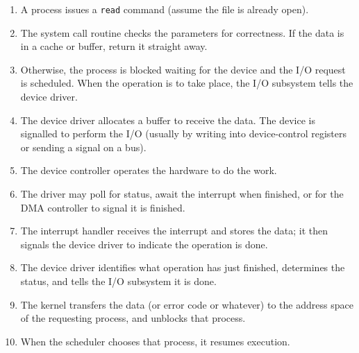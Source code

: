 \begin{enumerate}
	\item A process issues a \texttt{read} command (assume the file is already open).
	\item The system call routine checks the parameters for correctness. If the data is in a cache or buffer, return it straight away.
	\item Otherwise, the process is blocked waiting for the device and the I/O request is scheduled. When the operation is to take place, the I/O subsystem tells the device driver.
	\item The device driver allocates a buffer to receive the data. The device is signalled to perform the I/O (usually by writing into device-control registers or sending a signal on a bus).
	\item The device controller operates the hardware to do the work.
	\item The driver may poll for status, await the interrupt when finished, or for the DMA controller to signal it is finished.
	\item The interrupt handler receives the interrupt and stores the data; it then signals the device driver to indicate the operation is done.
	\item The device driver identifies what operation has just finished, determines the status, and tells the I/O subsystem it is done.
	\item The kernel transfers the data (or error code or whatever) to the address space of the requesting process, and unblocks that process.
	\item When the scheduler chooses that process, it resumes execution.
\end{enumerate}




